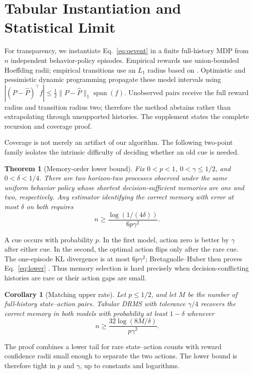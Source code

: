 \documentclass[letterpaper]{article} %
\newtheorem{theorem}{Theorem}
\newtheorem{corollary}{Corollary}
\theoremstyle{remark}
\newcommand{\DRMS}{\textnormal{\textsc{DRMS}}}
\newcommand{\spanop}{\operatorname{span}}
\begin{document}
\section{Tabular Instantiation and Statistical Limit}

For transparency, we instantiate Eq.~\eqref{eq:qevent} in a finite
full-history MDP from $n$ independent behavior-policy episodes. Empirical
rewards use union-bounded Hoeffding radii; empirical transitions use an
$L_1$ radius based on \citet{weissman2003l1}. Optimistic and pessimistic
dynamic programming propagate these model intervals using
$|(P-\widehat P)^\top f|\leq\frac12\|P-\widehat P\|_1\spanop(f)$.
Unobserved pairs receive the full reward radius and transition radius two;
therefore the method abstains rather than extrapolating through unsupported
histories. The supplement states the complete recursion and coverage proof.

Coverage is not merely an artifact of our algorithm. The following two-point
family isolates the intrinsic difficulty of deciding whether an old cue is
needed.

\begin{theorem}[Memory-order lower bound]\label{thm:lower}
Fix $0<p<1$, $0<\gamma\leq1/2$, and $0<\delta<1/4$. There are two
horizon-two processes observed under the same uniform behavior policy whose
shortest decision-sufficient memories are one and two, respectively. Any
estimator identifying the correct memory with error at most $\delta$ on both
requires
\[
n\geq \frac{\log(1/(4\delta))}{6p\gamma^2}.
\tag{17}\label{eq:lower}
\]
\end{theorem}

A cue occurs with probability $p$. In the first model, action zero is better
by $\gamma$ after either cue. In the second, the optimal action flips only
after the rare cue. The one-episode KL divergence is at most $6p\gamma^2$;
Bretagnolle--Huber then proves Eq.~\eqref{eq:lower}
\citep{tsybakov2009nonparametric}. Thus memory selection is hard precisely
when decision-conflicting histories are rare or their action gaps are small.

\begin{corollary}[Matching upper rate]\label{cor:upper}
Let $p\leq1/2$, and let $M$ be the number of full-history state--action pairs.
Tabular \DRMS{} with tolerance $\gamma/4$ recovers the correct memory in both
models with probability at least $1-\delta$ whenever
\[
n\geq\frac{32\log(8M/\delta)}{p\gamma^2}.
\tag{18}\label{eq:upperrate}
\]
\end{corollary}
The proof combines a lower tail for rare state--action counts with reward
confidence radii small enough to separate the two actions. The lower bound is
therefore tight in $p$ and $\gamma$, up to constants and logarithms.
\end{document}
